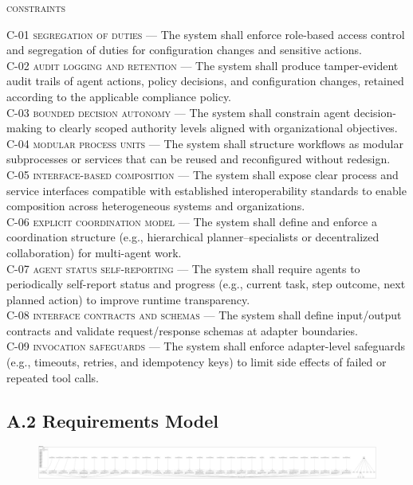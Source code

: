 \noindent \textsc{constraints} \\
\begin{footnotesize}
\noindent \textsc{C-01 segregation of duties} --- The system shall enforce role-based access control and segregation of duties for configuration changes and sensitive actions. \\
\noindent \textsc{C-02 audit logging and retention} --- The system shall produce tamper-evident audit trails of agent actions, policy decisions, and configuration changes, retained according to the applicable compliance policy. \\
\noindent \textsc{C-03 bounded decision autonomy} --- The system shall constrain agent decision-making to clearly scoped authority levels aligned with organizational objectives. \\
\noindent \textsc{C-04 modular process units} --- The system shall structure workflows as modular subprocesses or services that can be reused and reconfigured without redesign. \\
\noindent \textsc{C-05 interface-based composition} --- The system shall expose clear process and service interfaces compatible with established interoperability standards to enable composition across heterogeneous systems and organizations. \\
\noindent \textsc{C-06 explicit coordination model} --- The system shall define and enforce a coordination structure (e.g., hierarchical planner–specialists or decentralized collaboration) for multi-agent work. \\
\noindent \textsc{C-07 agent status self-reporting} --- The system shall require agents to periodically self-report status and progress (e.g., current task, step outcome, next planned action) to improve runtime transparency. \\
\noindent \textsc{C-08 interface contracts and schemas} --- The system shall define input/output contracts and validate request/response schemas at adapter boundaries. \\
\noindent \textsc{C-09 invocation safeguards} --- The system shall enforce adapter-level safeguards (e.g., timeouts, retries, and idempotency keys) to limit side effects of failed or repeated tool calls.
\end{footnotesize}

\subsection*{A.2 Requirements Model}
\begin{figure}[H]
  \centering
  \includegraphics[width=\linewidth]{ressources/MAS/diagrams/MASRequirements.pdf}\label{fig:req}
\end{figure}

